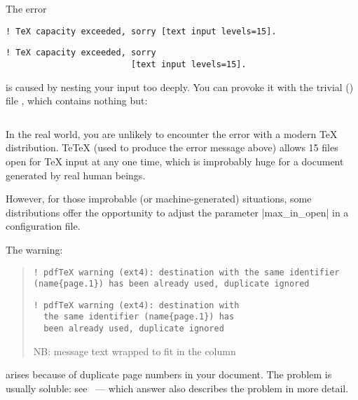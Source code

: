 {

The error
\begin{wideversion}
\begin{verbatim}
! TeX capacity exceeded, sorry [text input levels=15].
\end{verbatim}
\end{wideversion}
\begin{narrowversion}
\begin{verbatim}
! TeX capacity exceeded, sorry
                         [text input levels=15].
\end{verbatim}
\end{narrowversion}
is caused by nesting your input too deeply.  You can provoke it with
the trivial (\plaintex{}) file , which contains
nothing but: 
\begin{verbatim}

\end{verbatim}
In the real world, you are unlikely to encounter the error with a
modern \TeX{} distribution.  Te\TeX{} (used to produce the error
message above) allows 15 files open for \TeX{} input at any one time,
which is improbably huge for a document generated by real human
beings.

However, for those improbable (or machine-generated) situations,
some distributions offer the opportunity to adjust the parameter
|max_in_open| in a configuration file.


The warning:
\begin{quote}
\begin{wideversion}
\begin{verbatim}
! pdfTeX warning (ext4): destination with the same identifier
(name{page.1}) has been already used, duplicate ignored
\end{verbatim}
\end{wideversion}
\begin{narrowversion}
\begin{verbatim}
! pdfTeX warning (ext4): destination with
  the same identifier (name{page.1}) has
  been already used, duplicate ignored
\end{verbatim}
{\small NB: message text wrapped to fit in the column\par}
\end{narrowversion}
\end{quote}
arises because of duplicate page numbers in your document.  The
problem is usually soluble: see %
~--- which
answer also describes the problem in more detail.

}
